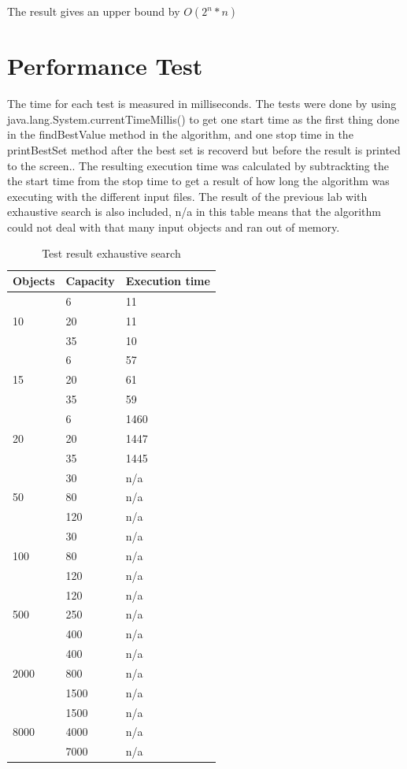 \documentclass{inc/mas}
\begin{document}
The result gives an upper bound by $O(2^n*n)$



\section{Performance Test}

The time for each test is measured in milliseconds. The tests were done by using java.lang.System.currentTimeMillis() to get one start time as the first thing done in the findBestValue method in the algorithm, and one stop time in the printBestSet method after the best set is recoverd but before the result is printed to the screen.. The resulting execution time was calculated by subtrackting the the start time from the stop time to get a result of how long the algorithm was executing with the different input files. The result of the previous lab with exhaustive search is also included, n/a in this table means that the algorithm could not deal with that many input objects and ran out of memory. \\

\begin{table}
\begin{center}
\caption{Test result exhaustive search}
\begin{tabular}{|l|l|l|} \hline
Objects &Capacity &Execution time\\ \hline
\multirow{3}{*}{10} & 6 & 11 \\
& 20 & 11 \\
& 35 & 10 \\ \hline
\multirow{3}{*}{15} & 6 & 57 \\
& 20 & 61 \\
& 35 & 59 \\ \hline
\multirow{3}{*}{20} & 6 & 1460 \\
& 20 & 1447 \\
& 35 & 1445 \\ \hline
\multirow{3}{*}{50} & 30 & n/a \\
& 80 & n/a \\
& 120 & n/a \\ \hline
\multirow{3}{*}{100} & 30 &  n/a\\
& 80 & n/a \\
& 120 & n/a \\ \hline
\multirow{3}{*}{500} & 120 & n/a \\
& 250 & n/a \\
& 400 & n/a \\ \hline
\multirow{3}{*}{2000} & 400 & n/a \\
& 800 & n/a \\
& 1500 & n/a \\ \hline
\multirow{3}{*}{8000} & 1500 & n/a \\
& 4000 & n/a \\
& 7000 & n/a \\ \hline
\end{tabular}
\end{center}
\end{table}
\end{document}
